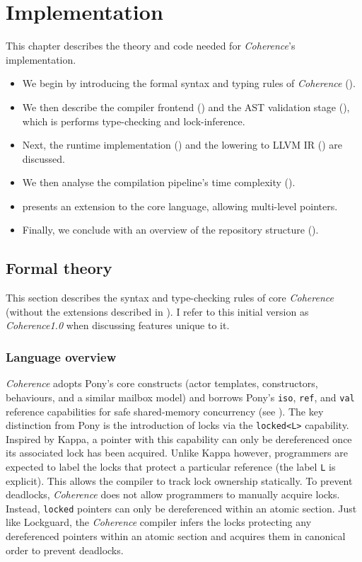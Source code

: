 \chapter{Implementation}
This chapter describes the theory and code needed for \textit{Coherence}'s implementation.
\begin{itemize}
    \item We begin by introducing the formal syntax and typing rules of \textit{Coherence} ().
    \item We then describe the compiler frontend () and the AST validation stage (), which is performs type-checking and lock-inference.
    \item Next, the runtime implementation () and the lowering to LLVM IR () are discussed.
    \item We then analyse the compilation pipeline's time complexity ().
    \item {} presents an extension to the core language, allowing multi-level pointers.
    \item Finally, we conclude with an overview of the repository structure ().
\end{itemize}

\section{Formal theory} \label{sec:theory}
This section describes the syntax and type-checking rules of core \textit{Coherence} (without the extensions described in ). I refer to this initial version as \textit{Coherence1.0} when discussing features unique to it.

\subsection{Language overview}
\textit{Coherence} adopts Pony's core constructs (actor templates, constructors, behaviours, and a similar mailbox model) and borrows Pony's \texttt{iso}, \texttt{ref}, and \texttt{val} reference capabilities for safe shared-memory concurrency (see ). The key distinction from Pony is the introduction of locks via the \texttt{locked<L>} capability. Inspired by Kappa, a pointer with this capability can only be dereferenced once its associated lock has been acquired. Unlike Kappa however, programmers are expected to label the locks that protect a particular reference (the label \texttt{L} is explicit). This allows the compiler to track lock ownership statically. To prevent deadlocks, \textit{Coherence} does not allow programmers to manually acquire locks. Instead, \texttt{locked} pointers can only be dereferenced within an atomic section. Just like Lockguard, the \textit{Coherence} compiler infers the locks protecting any dereferenced pointers within an atomic section and acquires them in canonical order to prevent deadlocks.

